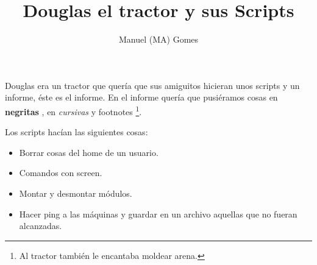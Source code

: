 \documentclass[10pt,a4paper]{article}
\title{Douglas el tractor y sus Scripts}
\author{Manuel (MA) Gomes}
\begin{document}
\maketitle

Douglas era un tractor que quer\'ia que sus amiguitos hicieran unos scripts y un informe, \'este es el informe. En el informe quer\'ia que pusi\'eramos cosas en \textbf{negritas} , en \textit{cursivas} y footnotes \footnote{Al tractor tambi\'en le encantaba moldear arena.}.

Los scripts hac\'ian las siguientes cosas:
\begin{itemize}
\item Borrar cosas del home de un usuario.
\item Comandos con screen.
\item Montar y desmontar m\'odulos.
\item Hacer ping a las m\'aquinas y guardar en un archivo aquellas que no fueran alcanzadas.

\end{itemize}
\end{document}

